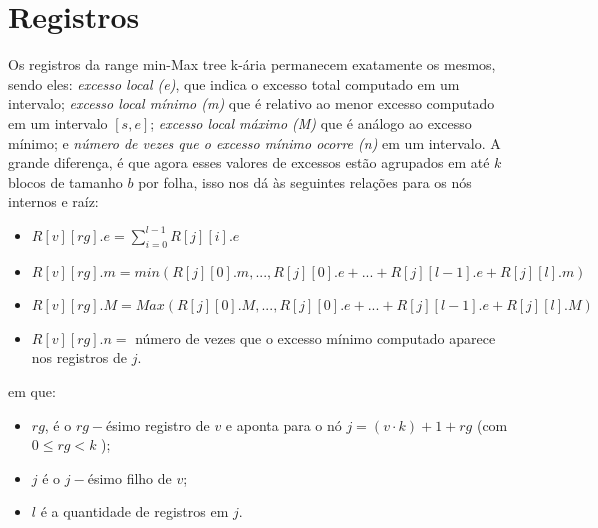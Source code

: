 \section{Registros}
Os registros da range min-Max tree k-ária permanecem exatamente os mesmos, sendo eles: \textit{excesso local (e)}, que indica o excesso total  computado em um intervalo; \textit{excesso local mínimo (m)} que é relativo ao menor excesso computado em um intervalo $[s,e]$; \textit{excesso local máximo (M)} que é análogo ao excesso mínimo; e \textit{número de vezes que o excesso mínimo ocorre (n)} em um intervalo. A grande diferença, é que agora esses valores de excessos estão agrupados em até $k$ blocos de tamanho $b$ por folha, isso nos dá às seguintes relações para os nós internos e raíz:

\begin{itemize}
    \item $R[v][rg].e = \displaystyle{\sum_{i=0}^{l-1} R[j][i].e} $
    \item $R[v][rg].m = min(R[j][0].m, ... , R[j][0].e + ... + R[j][l-1].e + R[j][l].m )$
    \item $R[v][rg].M = Max(R[j][0].M, ... , R[j][0].e + ... + R[j][l-1].e + R[j][l].M )$
    \item $R[v][rg].n =$ número de vezes que o excesso mínimo computado aparece nos registros de  $j$.  
\end{itemize}

em que:
\begin{itemize}
    \item $rg$, é o $rg-$ésimo registro de $v$ e aponta para o nó $j =(v\cdot k)+1+rg$ (com $0 \leq rg <  k$ );
    \item $j$ é o $j-$ésimo filho de $v$;
    \item $l$ é a quantidade de registros em $j$.
\end{itemize}


